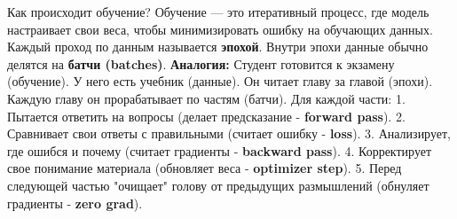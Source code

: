 \begin{myblock}{Как происходит обучение?}
    Обучение — это итеративный процесс, где модель настраивает свои веса, чтобы минимизировать ошибку на обучающих данных. Каждый проход по данным называется \textbf{эпохой}. Внутри эпохи данные обычно делятся на \textbf{батчи (batches)}.
    \textbf{Аналогия:} Студент готовится к экзамену (обучение). У него есть учебник (данные). Он читает главу за главой (эпохи). Каждую главу он прорабатывает по частям (батчи). Для каждой части:
    1.  Пытается ответить на вопросы (делает предсказание - \textbf{forward pass}).
    2.  Сравнивает свои ответы с правильными (считает ошибку - \textbf{loss}).
    3.  Анализирует, где ошибся и почему (считает градиенты - \textbf{backward pass}).
    4.  Корректирует свое понимание материала (обновляет веса - \textbf{optimizer step}).
    5.  Перед следующей частью "очищает" голову от предыдущих размышлений (обнуляет градиенты - \textbf{zero grad}).
\end{myblock}


